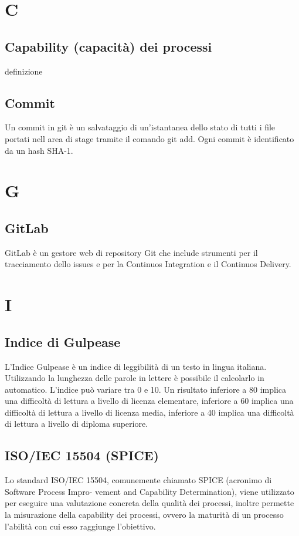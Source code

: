 \documentclass[11pt,a4paper]{article}
\begin{document}
	\section{C}
	\subsection{Capability (capacità) dei processi}
	definizione
	\subsection{Commit}
	Un commit in git è un salvataggio di un'istantanea dello stato di tutti i file portati nell area di stage tramite il comando git add. Ogni commit è identificato da un hash SHA-1.
	\section{G}
	\subsection{GitLab}
	GitLab è un gestore web di repository Git che include strumenti per il tracciamento dello issues e per la Continuos Integration e il Continuos Delivery.
	\section{I}
	\subsection{Indice di Gulpease}
	L'Indice Gulpease è un indice di leggibilità di un testo in lingua italiana. Utilizzando la lunghezza delle parole in lettere è possibile il calcolarlo in automatico.
	L'indice può variare tra 0 e 10. Un risultato inferiore a 80 implica una difficoltà di lettura a livello di licenza elementare, inferiore a 60 implica una difficoltà di lettura a livello di licenza media, inferiore a 40 implica una difficoltà di lettura a livello di diploma superiore.
	\subsection{ISO/IEC 15504 (SPICE)}
	Lo standard ISO/IEC 15504, comunemente chiamato SPICE (acronimo di Software Process Impro-
vement and Capability Determination), viene utilizzato per eseguire una valutazione concreta della
qualità dei processi, inoltre permette la misurazione della capability dei processi, ovvero la maturità
di un processo l’abilità con cui esso raggiunge l’obiettivo.
\end{document}
